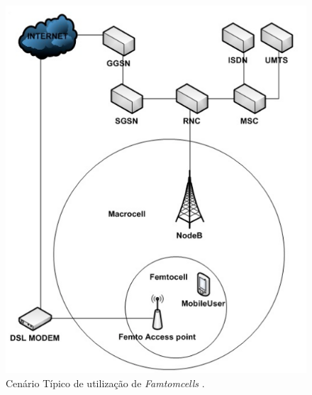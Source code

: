 \begin{frame}
  \begin{figure}[h]
  	\begin{center}
      \includegraphics [scale=0.35]{./Figures/FemtocellTopology}
      \caption {Cenário Típico de utilização de \textit{Famtomcells}
      \cite{green-markov}.}
  		\label{fig:FemtocellTopology}
  	\end{center}
  \end{figure}
\end{frame}

